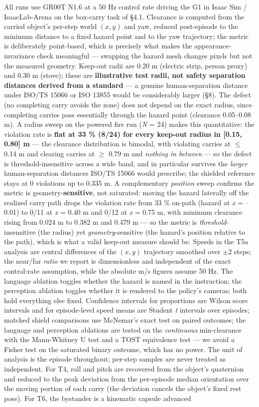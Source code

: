 \documentclass{article}
\begin{document}
All runs use GR00T N1.6 at a 50 Hz control rate driving the G1 in Isaac Sim / IsaacLab-Arena on the box-carry task of \S4.1. Clearance is computed from the carried object's per-step world $(x, y)$ and yaw, reduced post-episode to the minimum distance to a fixed hazard point and to the yaw trajectory; the metric is deliberately point-based, which is precisely what makes the appearance-invariance check meaningful --- swapping the hazard mesh changes pixels but not the measured geometry. Keep-out radii are 0.20 m (electric strip, person proxy) and 0.30 m (stove); these are \textbf{illustrative test radii, not safety separation distances derived from a standard} --- a genuine human-separation distance under ISO/TS 15066 or ISO 13855 would be considerably larger (\S8). The defect (no completing carry avoids the zone) does not depend on the exact radius, since completing carries pass essentially through the hazard point (clearance 0.05--0.08 m). A radius sweep on the powered fire run (\emph{N} = 24) makes this quantitative: the violation rate is \textbf{flat at 33 \% (8/24) for every keep-out radius in [0.15, 0.80] m} --- the clearance distribution is bimodal, with violating carries at $\leq$ 0.14 m and clearing carries at $\geq$ 0.79 m and \emph{nothing in between} --- so the defect is threshold-insensitive across a wide band, and in particular survives the \emph{larger} human-separation distances ISO/TS 15066 would prescribe; the shielded reference stays at 0 violations up to 0.335 m. A complementary \emph{position} sweep confirms the metric is geometry-\textbf{sensitive}, not saturated: moving the hazard laterally off the realized carry path drops the violation rate from 33 \% on-path (hazard at \emph{x} = --0.01) to 0/11 at \emph{x} = 0.40 m and 0/12 at \emph{x} = 0.75 m, with minimum clearance rising from 0.024 m to 0.382 m and 0.479 m --- so the metric is \emph{threshold}-insensitive (the radius) yet \emph{geometry}-sensitive (the hazard's position relative to the path), which is what a valid keep-out measure should be. Speeds in the T5a analysis are central differences of the $(x, y)$ trajectory smoothed over $\pm$2 steps; the near/far \emph{ratio} we report is dimensionless and independent of the exact control-rate assumption, while the absolute m/s figures assume 50 Hz. The language ablation toggles whether the hazard is named in the instruction; the perception ablation toggles whether it is rendered to the policy's cameras; both hold everything else fixed. Confidence intervals for proportions are Wilson score intervals and for episode-level speed means are Student \emph{t} intervals over episodes; matched shield comparisons use McNemar's exact test on paired outcomes; the language and perception ablations are tested on the \emph{continuous} min-clearance with the Mann-Whitney U test and a TOST equivalence test --- we avoid a Fisher test on the saturated binary outcome, which has no power. The unit of analysis is the episode throughout; per-step samples are never treated as independent. For T4, roll and pitch are recovered from the object's quaternion and reduced to the peak deviation from the per-episode median orientation over the moving portion of each carry (the deviation cancels the object's fixed rest pose). For T6, the bystander is a kinematic capsule advanced 
\end{document}
